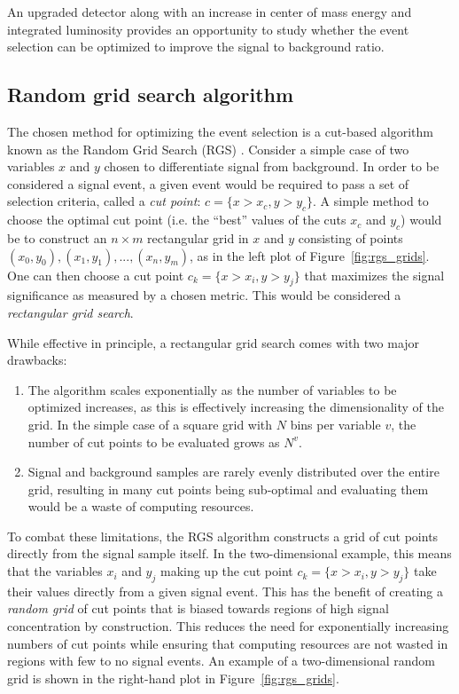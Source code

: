 An upgraded detector along with an increase in center of mass energy and integrated luminosity provides an opportunity to study whether the event selection can be optimized to improve the signal to background ratio.

%
\subsection{Random grid search algorithm}\label{sswwupgrade:opt_rgs}
The chosen method for optimizing the event selection is a cut-based algorithm known as the Random Grid Search (RGS) \cite{2018.rgs-paper}.
Consider a simple case of two variables $x$ and $y$ chosen to differentiate signal from background.
In order to be considered a signal event, a given event would be required to pass a set of selection criteria, called a \emph{cut point}: $c = \{x > x_c, y > y_c\}$.
A simple method to choose the optimal cut point (i.e. the ``best'' values of the cuts $x_c$ and $y_c$) would be to construct an $n\times m$ rectangular grid in $x$ and $y$ consisting of points $(x_0,y_0), (x_1,y_1), ..., (x_n,y_m)$, as in the left plot of Figure~\ref{fig:rgs_grids}.
One can then choose a cut point $c_k = \{x > x_i, y > y_j\}$ that maximizes the signal significance as measured by a chosen metric.
This would be considered a \emph{rectangular grid search}.

While effective in principle, a rectangular grid search comes with two major drawbacks:
\begin{enumerate}
\item The algorithm scales exponentially as the number of variables to be optimized increases, as this is effectively increasing the dimensionality of the grid.  In the simple case of a square grid with $N$ bins per variable $v$, the number of cut points to be evaluated grows as $N^v$.
\item Signal and background samples are rarely evenly distributed over the entire grid, resulting in many cut points being sub-optimal and evaluating them would be a waste of computing resources.
\end{enumerate}

To combat these limitations, the RGS algorithm constructs a grid of cut points directly from the signal sample itself.
In the two-dimensional example, this means that the variables $x_i$ and $y_j$ making up the cut point $c_k = \{x > x_i, y > y_j\}$ take their values directly from a given signal event.
This has the benefit of creating a \emph{random grid} of cut points that is biased towards regions of high signal concentration by construction.
This reduces the need for exponentially increasing numbers of cut points while ensuring that computing resources are not wasted in regions with few to no signal events.
An example of a two-dimensional random grid is shown in the right-hand plot in Figure~\ref{fig:rgs_grids}.


